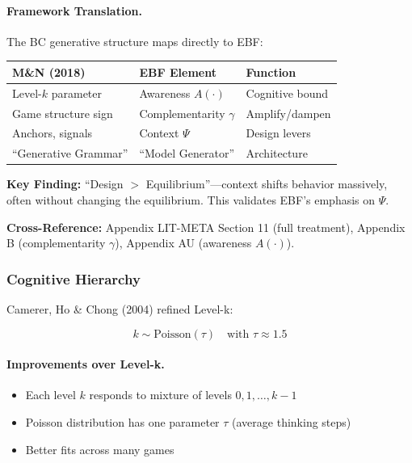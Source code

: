 \paragraph{Framework Translation.}
The BC generative structure maps directly to EBF:

\begin{center}
\renewcommand{\arraystretch}{1.3}
\begin{tabular}{@{}p{4.5cm}p{4.5cm}p{3.5cm}@{}}
\toprule
\textbf{M\&N (2018)} & \textbf{EBF Element} & \textbf{Function} \\
\midrule
Level-$k$ parameter & Awareness $A(\cdot)$ & Cognitive bound \\
Game structure sign & Complementarity $\gamma$ & Amplify/dampen \\
Anchors, signals & Context $\Psi$ & Design levers \\
``Generative Grammar'' & ``Model Generator'' & Architecture \\
\bottomrule
\end{tabular}
\end{center}

\textbf{Key Finding:} ``Design $>$ Equilibrium''---context shifts behavior massively,
often without changing the equilibrium. This validates EBF's emphasis on $\Psi$.

\textbf{Cross-Reference:} Appendix LIT-META Section 11 (full treatment),
Appendix B (complementarity $\gamma$), Appendix AU (awareness $A(\cdot)$).

\subsubsection{Cognitive Hierarchy}

Camerer, Ho \& Chong (2004) refined Level-k:

\begin{equation}
\boxed{
k \sim \text{Poisson}(\tau) \quad \text{with } \tau \approx 1.5
}
\label{eq:ch}
\end{equation}

\paragraph{Improvements over Level-k.}
\begin{itemize}
    \item Each level $k$ responds to mixture of levels $0, 1, \ldots, k-1$
    \item Poisson distribution has one parameter $\tau$ (average thinking steps)
    \item Better fits across many games
\end{itemize}

